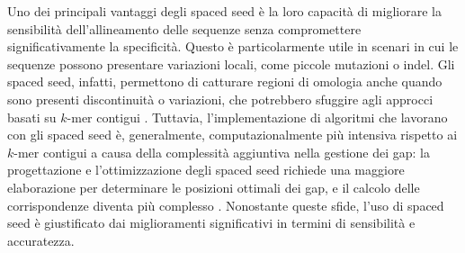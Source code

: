 %

Uno dei principali vantaggi degli spaced seed è la loro capacità di migliorare la sensibilità dell'allineamento delle sequenze senza compromettere significativamente la specificità. Questo è particolarmente utile in scenari in cui le sequenze possono presentare variazioni locali, come piccole mutazioni o indel. Gli spaced seed, infatti, permettono di catturare regioni di omologia anche quando sono presenti discontinuità o variazioni, che potrebbero sfuggire agli approcci basati su $k$-mer contigui \cite{mak2006improvements}. Tuttavia, l'implementazione di algoritmi che lavorano con gli spaced seed è, generalmente, computazionalmente più intensiva rispetto ai $k$-mer contigui a causa della complessità aggiuntiva nella gestione dei gap: la progettazione e l'ottimizzazione degli spaced seed richiede una maggiore elaborazione per determinare le posizioni ottimali dei gap, e il calcolo delle corrispondenze diventa più complesso \cite{chumakov2012bioinformatics}. Nonostante queste sfide, l'uso di spaced seed è giustificato dai miglioramenti significativi in termini di sensibilità e accuratezza.

